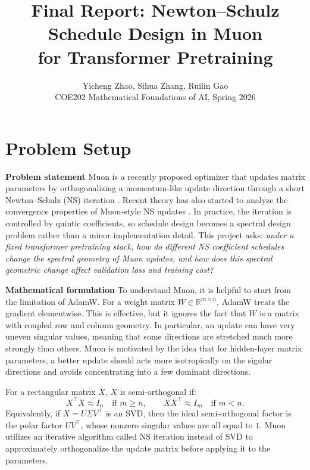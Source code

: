 \documentclass[10pt]{article}
\title{\vspace{-1.0em}\textbf{Final Report: Newton--Schulz Schedule Design in Muon\\for Transformer Pretraining}}
\author{Yicheng Zhao, Sihua Zhang, Ruilin Gao\\COE202 Mathematical Foundations of AI, Spring 2026}
\date{}
\begin{document}
\maketitle
\vspace{-1.2em}

\section{Problem Setup}
\textbf{Problem statement}
Muon is a recently proposed optimizer that updates matrix parameters by orthogonalizing a momentum-like update direction through a short Newton--Schulz (NS) iteration \citep{jordan2024muon,moddednanogpt2024}. Recent theory has also started to analyze the convergence properties of Muon-style NS updates \citep{kim2026convergence}. In practice, the iteration is controlled by quintic coefficients, so schedule design becomes a spectral design problem rather than a minor implementation detail. This project asks:
\emph{under a fixed transformer pretraining stack, how do different NS coefficient schedules change the spectral geometry of Muon updates, and how does this spectral geometric change affect validation loss and training cost?}

\textbf{Mathematical formulation}
To understand Muon, it is helpful to start from the limitation of AdamW. For a weight matrix $W\in\mathbb{R}^{m\times n}$, AdamW treats the gradient elementwise. This is effective, but it ignores the fact that $W$ is a matrix with coupled row and column geometry. In particular, an update can have very uneven singular values, meaning that some directions are stretched much more strongly than others. Muon is motivated by the idea that for hidden-layer matrix parameters, a better update should acts more isotropically on the sigular directions and avoids concentrating into a few dominant directions.

For a rectangular matrix $X$,  $X$ is semi-orthogonal if:
\begin{equation}
    X^\top X \approx I_n \quad \text{if } m\ge n,
    \qquad
    X X^\top \approx I_m \quad \text{if } m<n.
\end{equation}
Equivalently, if $X=U\Sigma V^\top$ is an SVD, then the ideal semi-orthogonal factor is the polar factor $UV^\top$, whose nonzero singular values are all equal to $1$. Muon utilizes an iterative algorithm called NS iteration instead of SVD to approximately orthogonalize the update matrix before applying it to the parameters.
\end{document}
